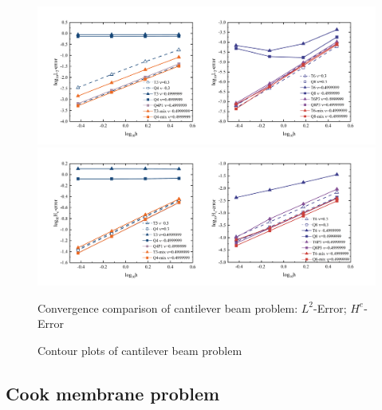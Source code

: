 \begin{figure}[!ht]
\centering
\begin{subcaptiongroup}
\includegraphics[width=\textwidth]{png/cantilever2.png}
    \label{cantilever_l2}
\includegraphics[width=\textwidth]{png/cantilever3.png}
    \label{cantilever_h1}
\end{subcaptiongroup}
\caption{Convergence comparison of cantilever beam problem:  $L^2$-Error;  $H^e$-Error}\label{cantilever_illsutration}
\end{figure}

\begin{figure}[!ht]
\centering
\caption{Contour plots of cantilever beam problem}\label{cantilever_contour}
\end{figure}

\subsection{Cook membrane problem}

